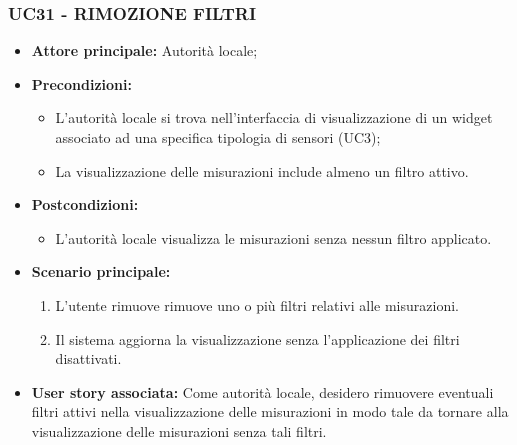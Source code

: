 \subsubsection{UC31 - RIMOZIONE FILTRI}
\begin{itemize}
    \item \textbf{Attore principale:} Autorità locale;
    \item \textbf{Precondizioni:}
        \begin{itemize}
        \item L'autorità locale si trova nell'interfaccia di visualizzazione di un widget associato ad una specifica tipologia di sensori (UC3);
        \item La visualizzazione delle misurazioni include almeno un filtro attivo.
        \end{itemize}
    \item \textbf{Postcondizioni:}
        \begin{itemize}
            \item L'autorità locale visualizza le misurazioni senza nessun filtro applicato.
        \end{itemize}
    \item \textbf{Scenario principale:}
        \begin{enumerate}
            \item L'utente rimuove rimuove uno o più filtri relativi alle misurazioni.
            \item Il sistema aggiorna la visualizzazione senza l'applicazione dei filtri disattivati.
        \end{enumerate}
    \item \textbf{User story associata:}
        Come autorità locale, desidero rimuovere eventuali filtri attivi nella visualizzazione delle misurazioni in modo tale da tornare alla visualizzazione delle misurazioni senza tali filtri.
\end{itemize}
